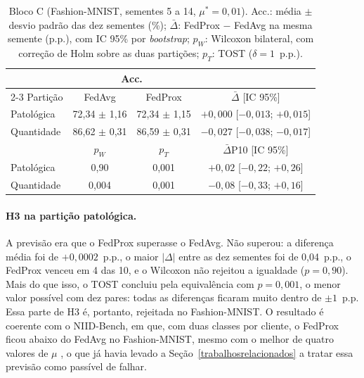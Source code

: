 \begin{table}[ht]
    \centering\small
    \caption{Bloco C (Fashion-MNIST, sementes 5 a 14, $\mu^* = 0{,}01$). Acc.: média $\pm$ desvio padrão das dez sementes (\%); $\bar\Delta$: FedProx $-$ FedAvg na mesma semente (p.p.), com IC 95\% por \textit{bootstrap}; $p_W$: Wilcoxon bilateral, com correção de Holm sobre as duas partições; $p_T$: TOST ($\delta = 1$~p.p.).}
    \label{tab:blocoC}
    \setlength{\tabcolsep}{2.5pt}
    \begin{tabular}{@{}lccc@{}}
        \toprule
        & \multicolumn{2}{c}{Acc.} & \\
        \cmidrule(lr){2-3}
        Partição & FedAvg & FedProx & $\bar\Delta$ [IC 95\%] \\
        \midrule
        Patológica & 72{,}34 $\pm$ 1{,}16 & 72{,}34 $\pm$ 1{,}15 & $+0{,}000$ [$-0{,}013$; $+0{,}015$] \\
        Quantidade & 86{,}62 $\pm$ 0{,}31 & 86{,}59 $\pm$ 0{,}31 & $-0{,}027$ [$-0{,}038$; $-0{,}017$] \\
        \midrule
        & $p_W$ & $p_T$ & $\bar\Delta$P10 [IC 95\%] \\
        \midrule
        Patológica & 0{,}90 & 0{,}001 & $+0{,}02$ [$-0{,}22$; $+0{,}26$] \\
        Quantidade & 0{,}004 & 0{,}001 & $-0{,}08$ [$-0{,}33$; $+0{,}16$] \\
        \bottomrule
    \end{tabular}
\end{table}

\paragraph{H3 na partição patológica.} A previsão era que o FedProx superasse o FedAvg. Não superou: a diferença média foi de $+0{,}0002$~p.p., o maior $|\Delta|$ entre as dez sementes foi de 0,04~p.p., o FedProx venceu em 4 das 10, e o Wilcoxon não rejeitou a igualdade ($p = 0{,}90$). Mais do que isso, o TOST concluiu pela equivalência com $p = 0{,}001$, o menor valor possível com dez pares: todas as diferenças ficaram muito dentro de $\pm 1$~p.p. Essa parte de H3 é, portanto, rejeitada no Fashion-MNIST. O resultado é coerente com o NIID-Bench, em que, com duas classes por cliente, o FedProx ficou abaixo do FedAvg no Fashion-MNIST, mesmo com o melhor de quatro valores de $\mu$ \citep{li2022niidbench}, o que já havia levado a Seção~\ref{trabalhosrelacionados} a tratar essa previsão como passível de falhar.


